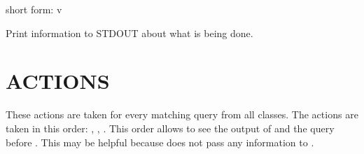 \documentclass[letterpaper,10pt,english]{sphinxmanual}
\begin{document}

\begin{fulllineitems}
\label{\detokenize{mariadb-kill:cmdoption-mariadb-kill-verbose}}
\sphinxAtStartPar
short form: \sphinxhyphen{}v

\sphinxAtStartPar
Print information to STDOUT about what is being done.

\end{fulllineitems}



\section{ACTIONS}
\label{\detokenize{mariadb-kill:actions}}
\sphinxAtStartPar
These actions are taken for every matching query from all classes.
The actions are taken in this order: {\hyperref[\detokenize{mariadb-kill:cmdoption-mariadb-kill-print}]{}}, {\hyperref[\detokenize{mariadb-kill:cmdoption-mariadb-kill-execute-command}]{}},
.  This order allows {\hyperref[\detokenize{mariadb-kill:cmdoption-mariadb-kill-execute-command}]{}}
to see the output of {\hyperref[\detokenize{mariadb-kill:cmdoption-mariadb-kill-print}]{}} and the query before
.  This may be helpful because  does
not pass any information to {\hyperref[\detokenize{mariadb-kill:cmdoption-mariadb-kill-execute-command}]{}}.
\end{document}
